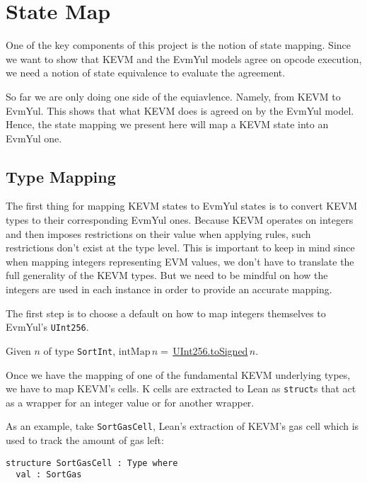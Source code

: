 \chapter{State Map}

One of the key components of this project is the notion of state mapping. Since
we want to show that KEVM and the EvmYul models agree on opcode execution, we
need a notion of state equivalence to evaluate the agreement.

So far we are only doing one side of the equiavlence. Namely, from KEVM to
EvmYul. This shows that what KEVM does is agreed on by the EvmYul model. Hence,
the state mapping we present here will map a KEVM state into an EvmYul one.

\section{Type Mapping}

The first thing for mapping KEVM states to EvmYul states is to convert KEVM
types to their corresponding EvmYul ones.
Because KEVM operates on integers and then imposes restrictions on their value
when applying rules, such restrictions don't exist at the type level. This is
important to keep in mind since when mapping integers representing EVM values,
we don't have to translate the full generality of the KEVM types. But we need to
be mindful on how the integers are used in each instance in order to provide an
accurate mapping.

The first step is to choose a default on how to map integers themselves to
EvmYul's \texttt{UInt256}.

\begin{definition}[intMap]\leanok\label{def:intMap}
Given $n$ of type \texttt{SortInt},
$\text{intMap}\, n =\,
$\href{https://runtimeverification.github.io/evm-equivalence/docs/EvmYul/UInt256.html#EvmYul.UInt256.toSigned}{UInt256.toSigned}$\,n$.
\end{definition}

Once we have the mapping of one of the fundamental KEVM underlying types, we
have to map KEVM's cells. K cells are extracted to Lean as \texttt{struct}s that
act as a wrapper for an integer value or for another wrapper.

As an example, take \texttt{SortGasCell},  Lean's extraction of KEVM's gas cell
which is used to track the amount of gas left:

\begin{verbatim}
structure SortGasCell : Type where
  val : SortGas
\end{verbatim}

